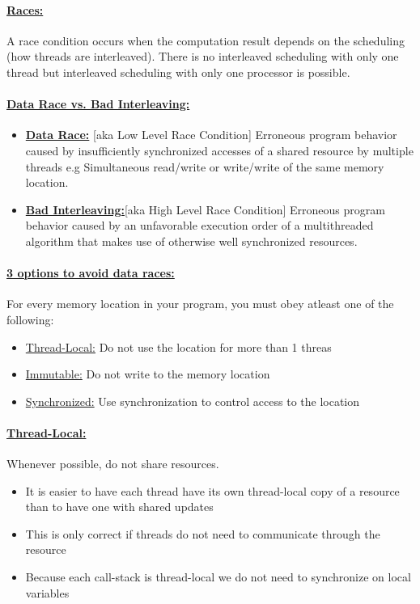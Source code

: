 \documentclass[8pt]{extreport}
\begin{document}
\paragraph{\underline{Races:}} A race condition occurs when the computation result depends on the scheduling (how threads are interleaved). There is no interleaved scheduling with only one thread but interleaved scheduling with only one processor is possible.
\paragraph{\underline{Data Race vs. Bad Interleaving:}}
\begin{itemize}
\item \textbf{\underline{Data Race:}} [aka Low Level Race Condition] Erroneous program behavior caused by insufficiently synchronized accesses of a shared resource by multiple threads e.g Simultaneous read/write or write/write of the same memory location.
\item \textbf{\underline{Bad Interleaving:}}[aka High Level Race Condition] Erroneous program behavior caused by an unfavorable execution order of a multithreaded algorithm that makes use of otherwise well synchronized resources.
\end{itemize}
\paragraph{\underline{3 options to avoid data races:}}For every memory location in your program, you must obey atleast one of the following:
\begin{itemize}
\item \underline{Thread-Local:} Do not use the location for more than 1 threas
\item \underline{Immutable:} Do not write to the memory location
\item \underline{Synchronized:} Use synchronization to control access to the location
\end{itemize}
\paragraph{\underline{Thread-Local:}} Whenever possible, do not share resources.
\begin{itemize}
\item It is easier to have each thread have its own thread-local copy of a resource than to have one with shared updates
\item This is only correct if threads do not need to communicate through the resource
\item Because each call-stack is thread-local we do not need to synchronize on local variables
\end{itemize}
\end{document}
